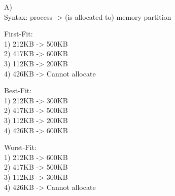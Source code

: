 \documentclass[letterpaper, 10pt,DIV=13]{scrartcl}
\numberwithin{equation}{section} %
\numberwithin{figure}{section} %
\numberwithin{table}{section} %
\begin{document}
A)\\
Syntax: process -> (is allocated to) memory partition

First-Fit:\\
1) 212KB -> 500KB\\
2) 417KB -> 600KB\\
3) 112KB -> 200KB\\
4) 426KB -> Cannot allocate

Best-Fit:\\
1) 212KB -> 300KB\\
2) 417KB -> 500KB\\
3) 112KB -> 200KB\\
4) 426KB -> 600KB

Worst-Fit:\\
1) 212KB -> 600KB\\
2) 417KB -> 500KB\\
3) 112KB -> 300KB\\
4) 426KB -> Cannot allocate
\end{document}

